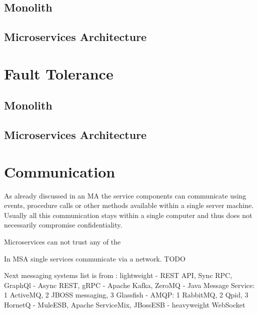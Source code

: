 \subsection{Monolith}
\subsection{Microservices Architecture}



\section{Fault Tolerance}
\subsection{Monolith}
\subsection{Microservices Architecture}



\section{Communication}
\begin{sloppypar}
    As already discussed in an MA the service components can communicate using 
    events, procedure calls or other methods available within a single server 
    machine. Usually all this communication stays within a single computer and 
    thus does not necessarily compromise confidentiality.
\end{sloppypar}
\begin{sloppypar}
    Microservices can not trust any of the \citep{otterstad}
\end{sloppypar}


\begin{sloppypar}
    In MSA single services communicate via a network.
    TODO

    Next messaging systems list is from \citep{secchalmsa}:
lightweight
-
    REST API,
    Sync RPC,
    GraphQl
    -
    Async REST,
    gRPC
    - 
    Apache Kafka,
    ZeroMQ
    -
    Java Message Service:
    1 ActiveMQ,
    2 JBOSS messaging,
    3 Glassfish
    -
    AMQP:
    1 RabbitMQ,
    2 Qpid,
    3 HornetQ
    -
    MuleESB,
    Apache ServiceMix,
    JBossESB
-
heavyweight
    WebSocket
\end{sloppypar}

